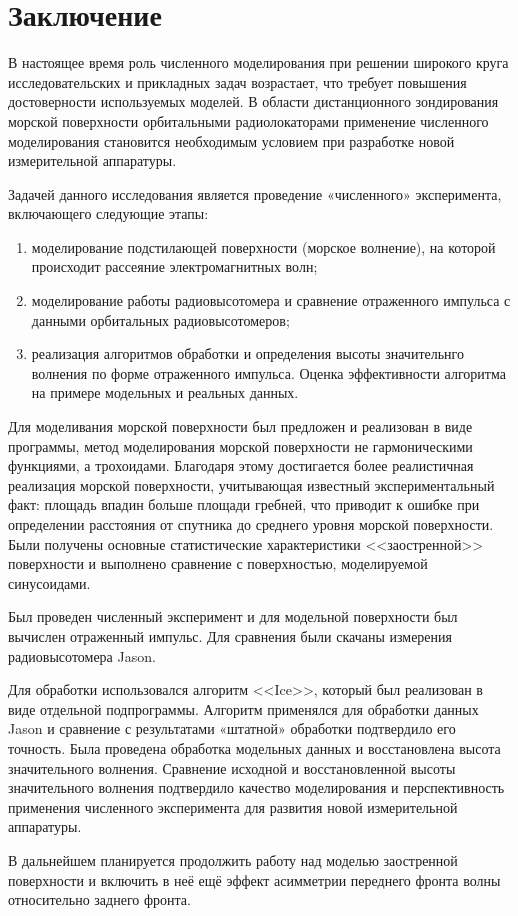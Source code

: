 \section{Заключение}%
\label{sec:zakliuchenie}

В настоящее время роль численного моделирования при решении широкого круга
исследовательских и прикладных задач возрастает, что требует повышения
достоверности используемых моделей. В области дистанционного зондирования
морской поверхности орбитальными радиолокаторами применение численного
моделирования становится необходимым условием при разработке новой
измерительной аппаратуры.

Задачей данного исследования является проведение «численного» эксперимента,
включающего следующие этапы: 
\begin{enumerate}
    \item моделирование подстилающей поверхности (морское
волнение), на которой происходит рассеяние электромагнитных волн; 
    \item моделирование работы радиовысотомера и сравнение отраженного импульса с данными орбитальных радиовысотомеров; 
    \item реализация алгоритмов обработки и определения высоты значительнго
        волнения по форме отраженного импульса. Оценка эффективности алгоритма
        на примере модельных и реальных данных.
\end{enumerate}

 
Для моделивания морской поверхности был предложен и реализован в виде
программы, метод моделирования морской поверхности не гармоническими функциями,
а трохоидами. Благодаря этому достигается более реалистичная реализация морской
поверхности, учитывающая известный экспериментальный факт: площадь впадин
больше площади гребней, что приводит к ошибке при определении расстояния от
спутника до среднего уровня морской поверхности. Были получены основные
статистические характеристики <<заостренной>> поверхности и выполнено сравнение с
поверхностью, моделируемой синусоидами.

Был проведен численный эксперимент и для модельной поверхности был вычислен
отраженный импульс.  Для сравнения были скачаны измерения радиовысотомера
Jason.

Для обработки использовался алгоритм <<Ice>>, который был реализован в виде
отдельной подпрограммы. Алгоритм применялся для обработки данных Jason и
сравнение с результатами «штатной» обработки подтвердило его точность. Была
проведена обработка модельных данных и восстановлена высота значительного
волнения. Сравнение исходной и восстановленной высоты значительного волнения
подтвердило качество моделирования и перспективность применения численного
эксперимента для развития новой измерительной аппаратуры. 

В дальнейшем планируется продолжить работу над моделью заостренной поверхности
и включить в неё ещё эффект асимметрии переднего фронта волны относительно
заднего фронта.

